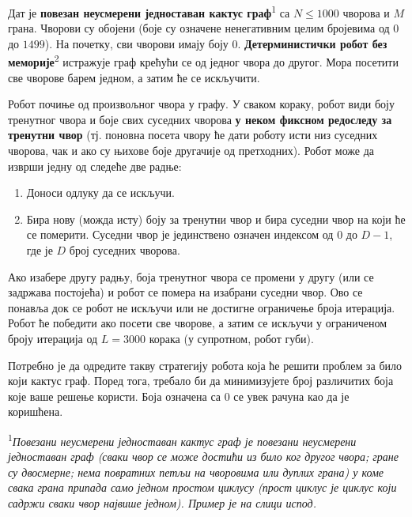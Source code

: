 \documentclass[12pt]{article}
\begin{document}
\renewcommand{\round}{Дан 2}
\renewcommand{\problemName}{Задатак Navigation}
\renewcommand{\lang}{Српски}

\renewcommand{\tl}{$3$ секунде}
\renewcommand{\ml}{$512$ MB}
\problem{\problemName}

Дат је \textbf{повезан неусмерени једноставан кактус граф}\textsuperscript{1} са $N \leq 1000$ чворова и $M$ грана.
Чворови су обојени (боје су означене ненегативним целим бројевима од $0$ до $1499$). На почетку, сви чворови имају боју $0$. \textbf{Детерминистички робот без меморије}\textsuperscript{2} истражује граф крећући се од једног чвора до другог. Мора посетити све чворове барем једном, а затим ће се искључити.

Робот почиње од произвољног чвора у графу. У сваком кораку, робот види боју тренутног чвора и боје свих суседних чворова \textbf{у неком фиксном редоследу за тренутни чвор} (тј. поновна посета чвору ће дати роботу исти низ суседних чворова, чак и ако су њихове боје другачије од претходних). Робот може да изврши једну од следеће две радње:
\begin{enumerate}
\item Доноси одлуку да се искључи.
\item Бира нову (можда исту) боју за тренутни чвор и бира суседни чвор на који ће се померити. Суседни чвор је јединствено означен индексом од $0$ до $D-1$, где је $D$ број суседних чворова.
\end{enumerate}

Ако изабере другу радњу, боја тренутног чвора се промени у другу (или се задржава постојећа) и робот се помера на изабрани суседни чвор. Ово се понавља док се робот не искључи или не достигне ограничење броја итерација. Робот ће победити ако посети све чворове, а затим се искључи у ограниченом броју итерација од $L = 3000$ корака (у супротном, робот губи).

Потребно је да одредите такву стратегију робота која ће решити проблем за било који кактус граф. Поред тога, требало би да минимизујете број различитих боја које ваше решење користи. Боја означена са 0 се увек рачуна као да је коришћена.

\textsuperscript{1}\textit{Повезани неусмерени једноставан кактус граф је повезани неусмерени једноставан граф (сваки чвор се може достићи из било ког другог чвора; гране су двосмерне; нема повратних петљи на чворовима или дуплих грана) у коме свака грана припада само једном простом циклусу (прост циклус је циклус који садржи сваки чвор највише једном). Пример је на слици испод.}
\end{document}
